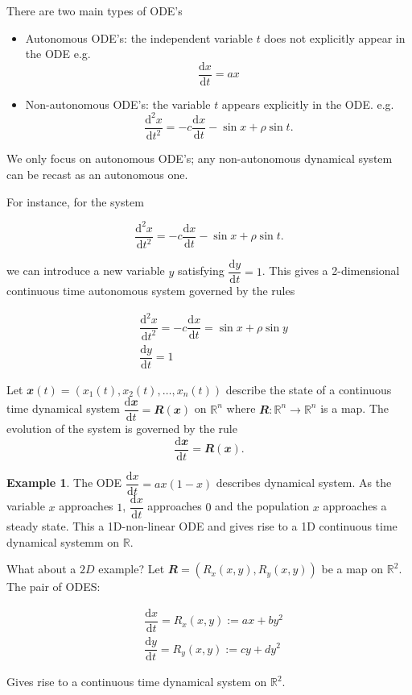 \documentclass[
  a4paper,
  oneside,
  final]{krantz}
\providecommand{\tightlist}{%
  \setlength{\itemsep}{0pt}\setlength{\parskip}{0pt}}
\newcommand{\R}{\mathbb{R}}
\renewcommand{\d}{\mathrm{d}}
\renewcommand{\v}[1]{{\mathbfit{#1}}}
\newcommand{\der}[2]{\dfrac{\d #1}{\d #2}}
\newcommand{\dern}[3]{\dfrac{\d^{#3} #1}{\d #2 ^{#3}}}
\theoremstyle{definition}
\theoremstyle{definition}
\newtheorem{example}{Example}[chapter]
\theoremstyle{definition}
\theoremstyle{definition}
\theoremstyle{remark}
\begin{document}
There are two main types of ODE's

\begin{itemize}
\tightlist
\item
  Autonomous ODE's: the independent variable \(t\) does not explicitly appear in the ODE e.g.
  \[ \der{x}{t} = ax\]
\item
  Non-autonomous ODE's: the variable \(t\) appears explicitly in the ODE. e.g.
  \[ \dern{x}{t}{2} = -c \der{x}{t}  - \sin x + \rho \sin t.\]
\end{itemize}

We only focus on autonomous ODE's; any non-autonomous dynamical system can be recast as an autonomous one.

For instance, for the system

\[ \dern{x}{t}{2} = -c \der{x}{t}  - \sin x + \rho \sin t.\]

we can introduce a new variable \(y\) satisfying \(\der{y}{t} = 1\). This gives a 2-dimensional continuous time autonomous system governed by the rules

\begin{align*}
&\dern{x}{t}{2} = -c \der{x}{t} = \sin x + \rho \sin y \\
& \der{y}{t} = 1
\end{align*}

Let \(\v{x}(t) = ( x_1(t), x_2(t), \ldots, x_{n}(t))\) describe the state of a continuous time dynamical system \(\der{\v{x}}{t} = \v{R}(\v{x})\) on \(\R^{n}\) where \(\v{R}: \R^{n} \to \R^{n}\) is a map. The evolution of the system is governed by the rule
\[\der{\v{x}}{t} = \v{R}(\v{x}).\]

\begin{example}
The ODE \(\der{x}{t} = a x (1-x)\) describes dynamical system. As the variable \(x\) approaches \(1\), \(\der{x}{t}\) approaches \(0\) and the population \(x\) approaches a steady state. This a 1D-non-linear ODE and gives rise to a 1D continuous time dynamical systemm on \(\R\).

What about a \(2D\) example? Let \(\v{R} = (R_x(x,y), R_{y}(x,y))\) be a map on \(\R^2\). The pair of ODES:

\begin{align*}
 &\der{x}{t} =  R_{x}(x,y) := ax + by^2  \\
 &\der{y}{t} = R_{y}(x,y) := cy + dy^2
\end{align*}

Gives rise to a continuous time dynamical system on \(\R^2\).
\end{example}
\end{document}
